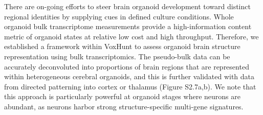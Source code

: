 There are on-going efforts to steer brain organoid development toward distinct regional identities by supplying cues in defined culture conditions. Whole organoid bulk transcriptome measurements provide a high-information content metric of organoid states at relative low cost and high throughput. Therefore, we established a framework within VoxHunt to assess organoid brain structure representation using bulk transcriptomics. The pseudo-bulk data can be accurately deconvoluted into proportions of brain regions that are represented within heterogeneous cerebral organoids, and this is further validated with data from directed patterning into cortex or thalamus (Figure S2.7a,b). We note that this approach is particularly powerful at organoid stages where neurons are abundant, as neurons harbor strong structure-specific multi-gene signatures.


